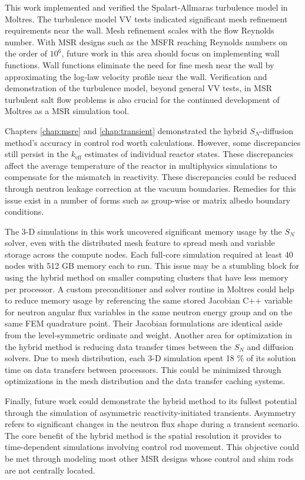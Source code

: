 This work implemented and verified the Spalart-Allmaras turbulence model in Moltres. The turbulence
model \gls{VV} tests indicated significant mesh refinement requirements near the wall. Mesh
refinement scales with the flow Reynolds number. With \gls{MSR} designs such as the \gls{MSFR}
reaching Reynolds numbers on the order of $10^6$, future work in this area should focus on
implementing wall functions. Wall functions eliminate the need for fine mesh near the wall by
approximating the log-law velocity profile near the wall. Verification and demonstration of the
turbulence model, beyond general \gls{VV} tests, in \gls{MSR} turbulent salt flow problems is also
crucial for the continued development of Moltres as a \gls{MSR} simulation tool.

Chapters \ref{chap:msre} and \ref{chap:transient} demonstrated the hybrid $S_N$-diffusion method's
accuracy in control rod worth calculations. However, some discrepancies still persist in the
$k_\text{eff}$ estimates of individual reactor states. These discrepancies affect the average
temperature of the reactor in multiphysics simulations to compensate for the mismatch in
reactivity. These discrepancies could be reduced through
neutron leakage correction at the vacuum boundaries. Remedies for this issue exist in a number of
forms such as group-wise or matrix albedo boundary conditions.

The 3-D simulations in this work uncovered significant memory usage by the $S_N$ solver, even
with the distributed mesh feature to spread mesh and variable storage across the compute nodes.
Each full-core simulation required at least 40 nodes with 512 GB memory each to run.
This issue may be a stumbling block for using the hybrid method on smaller computing clusters that
have less memory per processor. A custom preconditioner and solver routine in Moltres could help to
reduce memory usage by referencing the same stored Jacobian C++ variable for neutron angular flux
variables in the same neutron energy group and on the same \gls{FEM} quadrature point. Their
Jacobian formulations are identical aside from the level-symmetric ordinate and weight. Another
area for optimization in the hybrid method is reducing data transfer times between the $S_N$ and
diffusion solvers. Due to mesh distribution, each 3-D simulation spent 18 \% of its solution time
on data transfers between processors. This could be minimized through optimizations in the mesh
distribution and the data transfer caching systems.

Finally, future work could demonstrate the hybrid method to its fullest potential through the
simulation of asymmetric reactivity-initiated transients. Asymmetry refers to significant changes
in the neutron flux shape during a transient scenario. The core benefit of the hybrid method is
the spatial resolution it provides to time-dependent simulations involving control rod movement.
This objective could be met through modeling most other \gls{MSR} designs whose control and shim
rods are not centrally located.
